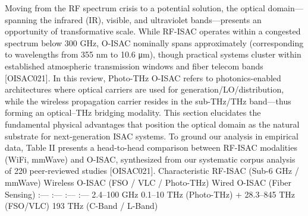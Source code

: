 {}
\markdownRendererSectionEnd 
\markdownRendererSectionEnd \markdownRendererSectionBegin
{}\markdownRendererInterblockSeparator
{}Moving from the RF spectrum crisis to a potential solution, the optical domain—spanning the infrared (IR), visible, and ultraviolet bands—presents an opportunity of transformative scale. While RF-ISAC operates within a congested spectrum below 300 GHz, O-ISAC nominally spans approximately  (corresponding to wavelengths from 355 nm to 10.6 μm), though practical systems cluster within established atmospheric transmission windows and fiber telecom bands [O\markdownRendererUnderscore{}ISAC\markdownRendererUnderscore{}021]. In this review, Photo-THz O-ISAC refers to photonics-enabled architectures where optical carriers are used for generation/LO/distribution, while the wireless propagation carrier resides in the sub-THz/THz band—thus forming an optical–THz bridging modality. This section elucidates the fundamental physical advantages that position the optical domain as the natural substrate for next-generation ISAC systems.\markdownRendererInterblockSeparator
{}\markdownRendererSectionBegin
{}\markdownRendererInterblockSeparator
{}To ground our analysis in empirical data, Table II presents a head-to-head comparison between RF-ISAC modalities (WiFi, mmWave) and O-ISAC, synthesized from our systematic corpus analysis of 220 peer-reviewed studies [O\markdownRendererUnderscore{}ISAC\markdownRendererUnderscore{}021].\markdownRendererParagraphSeparator
{}\markdownRendererParagraphSeparator
{}\markdownRendererPipe{} Characteristic \markdownRendererPipe{} RF-ISAC (Sub-6 GHz / mmWave) \markdownRendererPipe{} Wireless O-ISAC (FSO / VLC / Photo-THz) \markdownRendererPipe{} Wired O-ISAC (Fiber Sensing) \markdownRendererPipe{}\markdownRendererSoftLineBreak
{}\markdownRendererPipe{} :--- \markdownRendererPipe{} :--- \markdownRendererPipe{} :--- \markdownRendererPipe{} :--- \markdownRendererPipe{}\markdownRendererSoftLineBreak
{}\markdownRendererPipe{}  \markdownRendererPipe{} 2.4–100 GHz \markdownRendererPipe{} 0.1–10 THz (Photo-THz) + 28.3–845 THz (FSO/VLC) \markdownRendererPipe{} 193 THz (C-Band / L-Band) \markdownRendererPipe{}\markdownRendererSoftLineBreak
